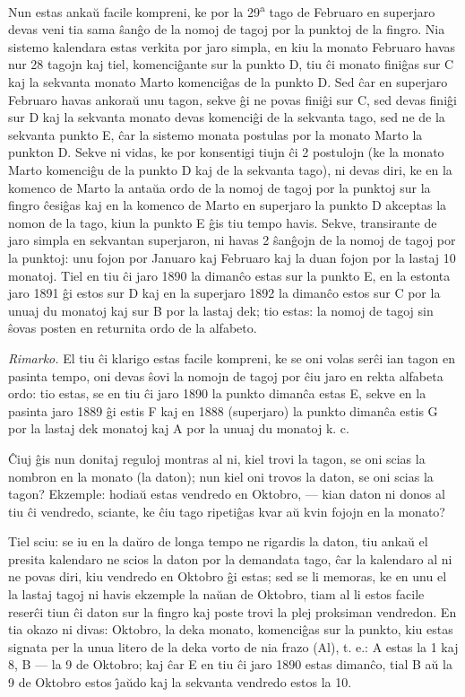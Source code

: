    Nun estas anka\u u facile kompreni, ke por la 29\textsuperscript{a} tago de Februaro
en superjaro devas veni tia sama \^san\^go de la nomoj de tagoj por
la punktoj de la fingro. Nia sistemo kalendara estas verkita por
jaro simpla, en kiu la monato Februaro havas nur 28 tagojn kaj tiel,
komenci\^gante sur la punkto D, tiu \^ci monato fini\^gas sur C kaj
la sekvanta monato Marto komenci\^gas de la punkto D. Sed \^car en
superjaro Februaro havas ankora\u u unu tagon, sekve \^gi ne povas
fini\^gi sur C, sed devas fini\^gi sur D kaj la sekvanta monato
devas komenci\^gi de la sekvanta tago, sed ne de la sekvanta punkto
E, \^car la sistemo monata postulas por la monato Marto la punkton
D. Sekve ni vidas, ke por konsentigi tiujn \^ci 2 postulojn (ke la
monato Marto komenci\^gu de la punkto D kaj de la sekvanta tago), ni
devas diri, ke en la komenco de Marto la anta\u ua ordo de la nomoj
de tagoj por la punktoj sur la fingro \^cesi\^gas kaj en la komenco
de Marto en superjaro la punkto D akceptas la nomon de la tago, kiun
la punkto E \^gis tiu tempo havis. Sekve, transirante de jaro simpla
en sekvantan superjaron, ni havas 2 \^san\^gojn de la nomoj de tagoj
por la punktoj: unu fojon por Januaro kaj Februaro kaj la duan fojon
por la lastaj 10 monatoj. Tiel en tiu \^ci jaro 1890 la diman\^co
estas sur la punkto E, en la estonta jaro 1891 \^gi estos sur D kaj
en la superjaro 1892 la diman\^co estos sur C por la unuaj du
monatoj kaj sur B por la lastaj dek; tio estas: la nomoj de tagoj
sin \^sovas posten en returnita ordo de la alfabeto.

{\it Rimarko.} El tiu \^ci klarigo estas facile kompreni, ke se oni
volas ser\^ci ian tagon en pasinta tempo, oni devas \^sovi la nomojn
de tagoj por \^ciu jaro en rekta alfabeta ordo: tio estas, se en tiu
\^ci jaro 1890 la punkto diman\^ca estas E, sekve en la pasinta jaro
1889 \^gi estis F kaj en 1888 (superjaro) la punkto diman\^ca estis
G por la lastaj dek monatoj kaj A por la unuaj du monatoj k. c.

   \^Ciuj \^gis nun donitaj reguloj montras al ni, kiel trovi la tagon,
se oni scias la nombron en la monato (la daton); nun kiel oni trovos
la daton, se oni scias la tagon? Ekzemple: hodia\u u estas vendredo
en Oktobro, --- kian daton ni donos al tiu \^ci vendredo, sciante,
ke \^ciu tago ripeti\^gas kvar a\u u kvin fojojn en la monato?

   Tiel sciu: se iu en la da\u uro de longa tempo ne rigardis la daton,
tiu anka\u u el presita kalendaro ne scios la daton por la demandata
tago, \^car la kalendaro al ni ne povas diri, kiu vendredo en
Oktobro \^gi estas; sed se li memoras, ke en unu el la lastaj tagoj
ni havis ekzemple la na\u uan de Oktobro, tiam al li estos facile
reser\^ci tiun \^ci daton sur la fingro kaj poste trovi la plej
proksiman vendredon. En tia okazo ni divas: Oktobro, la deka monato,
komenci\^gas sur la punkto, kiu estas signata per la unua litero de
la deka vorto de nia frazo (Al), t. e.: A estas la 1 kaj 8, B --- la
9 de Oktobro; kaj \^car E en tiu \^ci jaro 1890 estas diman\^co,
tial B a\u u la 9 de Oktobro estos \^{\j}a\u udo kaj la sekvanta
vendredo estos la 10.


